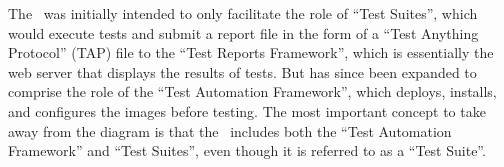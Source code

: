 The \cernvmtestframework\ was initially intended to only facilitate the role of ``Test Suites'', which would execute tests and submit a report
file in the form of a ``Test Anything Protocol'' (TAP) file to the ``Test Reports Framework'', which is essentially the web server that displays
the results of tests. But has since been expanded to comprise the role of the ``Test Automation Framework'', which deploys, installs, and configures
the \cernvm images before testing. The most important concept to take away from the diagram is that the \cernvmtestframework\ includes both the
``Test Automation Framework'' and ``Test Suites'', even though it is referred to as a ``Test Suite''.







